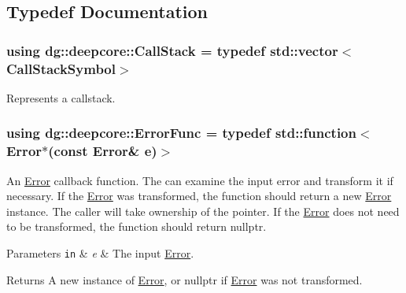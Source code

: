 \subsection{Typedef Documentation}
\subsubsection[{\texorpdfstring{Call\+Stack}{CallStack}}]{\setlength{\rightskip}{0pt plus 5cm}using {\bf dg\+::deepcore\+::\+Call\+Stack} = typedef std\+::vector$<$Call\+Stack\+Symbol$>$}\hypertarget{group___utility_module_gabdf2d70ae3aab3c57142eddec69a725c}{}\label{group___utility_module_gabdf2d70ae3aab3c57142eddec69a725c}


Represents a callstack. 

\subsubsection[{\texorpdfstring{Error\+Func}{ErrorFunc}}]{\setlength{\rightskip}{0pt plus 5cm}using {\bf dg\+::deepcore\+::\+Error\+Func} = typedef std\+::function$<$Error$\ast$(const Error\& e)$>$}\hypertarget{group___utility_module_gaa93ea71a4ed4c044369d3b323aec4435}{}\label{group___utility_module_gaa93ea71a4ed4c044369d3b323aec4435}


An \hyperlink{classdg_1_1deepcore_1_1_error}{Error} callback function. The can examine the input error and transform it if necessary. If the \hyperlink{classdg_1_1deepcore_1_1_error}{Error} was transformed, the function should return a new \hyperlink{classdg_1_1deepcore_1_1_error}{Error} instance. The caller will take ownership of the pointer. If the \hyperlink{classdg_1_1deepcore_1_1_error}{Error} does not need to be transformed, the function should return nullptr. 


\begin{DoxyParams}[1]{Parameters}
\mbox{\tt in}  & {\em e} & The input \hyperlink{classdg_1_1deepcore_1_1_error}{Error}. \\
\hline
\end{DoxyParams}
\begin{DoxyReturn}{Returns}
A new instance of \hyperlink{classdg_1_1deepcore_1_1_error}{Error}, or nullptr if \hyperlink{classdg_1_1deepcore_1_1_error}{Error} was not transformed. 
\end{DoxyReturn}
